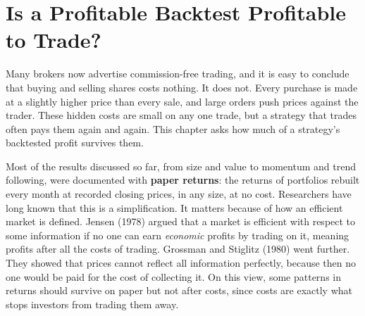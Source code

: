 \makeatletter
{}
\makeatother

\makeatletter
\makeatother

\chapter{Is a Profitable Backtest Profitable to Trade?}
\label{ch:14}
\providecommand{\term}[1]{\emph{#1}}

Many brokers now advertise commission-free trading, and it is easy to conclude that buying and selling shares costs nothing. It does not. Every purchase is made at a slightly higher price than every sale, and large orders push prices against the trader. These hidden costs are small on any one trade, but a strategy that trades often pays them again and again. This chapter asks how much of a strategy's backtested profit survives them.

Most of the results discussed so far, from size and value to momentum and trend following, were documented with \textbf{paper returns}: the returns of portfolios rebuilt every month at recorded closing prices, in any size, at no cost. Researchers have long known that this is a simplification. It matters because of how an efficient market is defined. Jensen (1978) argued that a market is efficient with respect to some information if no one can earn \emph{economic} profits by trading on it, meaning profits after all the costs of trading. Grossman and Stiglitz (1980) went further. They showed that prices cannot reflect all information perfectly, because then no one would be paid for the cost of collecting it. On this view, some patterns in returns should survive on paper but not after costs, since costs are exactly what stops investors from trading them away.

